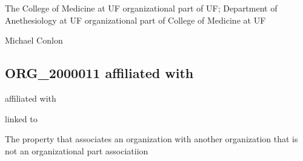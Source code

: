 \documentclass[letterpaper,10pt,english]{sphinxmanual}
\begin{document}
\begin{sphinxShadowBox}

\sphinxAtStartPar
The College of Medicine at UF organizational part of UF; Department of Anethesiology at UF organizational part of College of Medicine at UF
\end{sphinxShadowBox}

\begin{sphinxShadowBox}

\sphinxAtStartPar
Michael Conlon 
\end{sphinxShadowBox}
\begin{quote}

\ignorespaces \end{quote}


\subsection{ORG\_2000011 \sphinxhyphen{} affiliated with}
\label{\detokenize{doc-ORG_2000011:org-2000011-affiliated-with}}\label{\detokenize{doc-ORG_2000011:index-0}}\label{\detokenize{doc-ORG_2000011::doc}}
\begin{sphinxShadowBox}

\sphinxAtStartPar
affiliated with
\end{sphinxShadowBox}

\begin{sphinxShadowBox}

\sphinxAtStartPar
linked to
\end{sphinxShadowBox}

\begin{sphinxShadowBox}

\sphinxAtStartPar
{}
\end{sphinxShadowBox}

\begin{sphinxShadowBox}

\sphinxAtStartPar
The property that associates an organization with another organization that is not an organizational part associatiion
\end{sphinxShadowBox}
\end{document}
